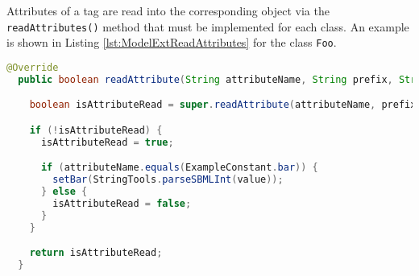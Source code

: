 Attributes of a tag are read into the corresponding object via the
\texttt{readAttributes()} method that must be implemented for each class.
An example is shown in Listing \ref{lst:ModelExtReadAttributes} for the class
\texttt{Foo}.

\begin{lstlisting}[language=Java,caption={Method to read the XML attributes},label={lst:ModelExtReadAttributes}]
  @Override
  public boolean readAttribute(String attributeName, String prefix, String value) {

    boolean isAttributeRead = super.readAttribute(attributeName, prefix, value);

    if (!isAttributeRead) {
      isAttributeRead = true;

      if (attributeName.equals(ExampleConstant.bar)) {
        setBar(StringTools.parseSBMLInt(value));
      } else {
        isAttributeRead = false;
      }
    }

    return isAttributeRead;
  }
\end{lstlisting}



